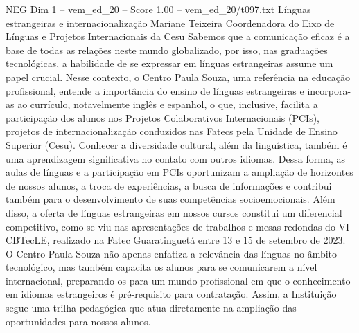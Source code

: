 \begin{textsample}{NEG Dim 1 – vem\_ed\_20 – Score 1.00 – vem\_ed\_20/t097.txt}  \label{ex:f1_neg_071}
Línguas estrangeiras e internacionalização Mariane Teixeira Coordenadora do Eixo de Línguas e Projetos Internacionais da Cesu Sabemos que a comunicação eficaz é a base de todas as relações neste mundo globalizado, por isso, nas graduações tecnológicas, a habilidade de se expressar em línguas estrangeiras assume um papel crucial.
Nesse contexto, o Centro Paula Souza, uma referência na educação profissional, entende a importância do ensino de línguas estrangeiras e incorpora-as ao currículo, notavelmente inglês e espanhol, o que, inclusive, facilita a participação dos alunos nos Projetos Colaborativos Internacionais (PCIs), projetos de internacionalização conduzidos nas Fatecs pela Unidade de Ensino Superior (Cesu).
Conhecer a diversidade cultural, além da linguística, também é uma aprendizagem significativa no contato com outros idiomas.
Dessa forma, as aulas de línguas e a participação em PCIs oportunizam a ampliação de horizontes de nossos alunos, a troca de experiências, a busca de informações e contribui também para o desenvolvimento de suas competências socioemocionais.
Além disso, a oferta de línguas estrangeiras em nossos cursos constitui um diferencial competitivo, como se viu nas apresentações de trabalhos e mesas-redondas do VI CBTecLE, realizado na Fatec Guaratinguetá entre 13 e 15 de setembro de 2023.
O Centro Paula Souza não apenas enfatiza a relevância das línguas no âmbito tecnológico, mas também capacita os alunos para se comunicarem a nível internacional, preparando-os para um mundo profissional em que o conhecimento em idiomas estrangeiros é pré-requisito para contratação.
Assim, a Instituição segue uma trilha pedagógica que atua diretamente na ampliação das oportunidades para nossos alunos.

\end{textsample}
